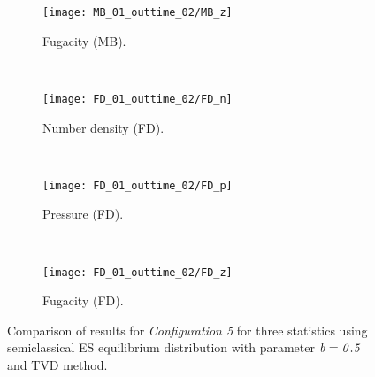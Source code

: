 \documentclass{rsproca}%
\begin{document}
\begin{figure}
        \begin{subfigure}[b]{0.32\textwidth}
                \centering
                \texttt{[image: MB\_01\_outtime\_02/MB\_z]}
                \caption{Fugacity (MB).}
                \label{fig:5ESBGK_MB_z_tau01}
        \end{subfigure}
        ~ %
        \begin{subfigure}[b]{0.32\textwidth}
                \centering
                \texttt{[image: FD\_01\_outtime\_02/FD\_n]}
                \caption{Number density (FD).}
                \label{fig:5ESBGK_FD_n_tau01}
        \end{subfigure}
        ~ %
        \begin{subfigure}[b]{0.32\textwidth}
                \centering
                \texttt{[image: FD\_01\_outtime\_02/FD\_p]}
                \caption{Pressure (FD).}
                \label{fig:5ESBGK_FD_p_tau01}
        \end{subfigure}
				~ %
        \begin{subfigure}[b]{0.32\textwidth}
                \centering
                \texttt{[image: FD\_01\_outtime\_02/FD\_z]}
                \caption{Fugacity (FD).}
                \label{fig:5ESBGK_FD_z_tau01}
        \end{subfigure}
				\caption{Comparison of results for \emph{Configuration 5} for three statistics using semiclassical ES equilibrium distribution with parameter $\it{b=0.5}$ and TVD method.}
				\label{fig:test_configuration5_tau01}
\end{figure}
\end{document}
